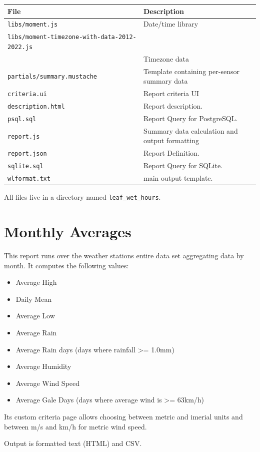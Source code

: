 \documentclass[a4paper,10pt]{book}
\begin{document}
\begin{tabular}{p{6cm} l}
\hline
\textbf{File} & \textbf{Description} \\
\hline
\verb|libs/moment.js| & Date/time library\\
\verb|libs/moment-timezone-with-data-2012-2022.js| & \\
& Timezone data \\
\verb|partials/summary.mustache| & Template containing per-sensor summary data\\
\verb|criteria.ui| & Report criteria UI \\
\verb|description.html| & Report description.\\
\verb|psql.sql| & Report Query for PostgreSQL. \\
\verb|report.js| & Summary data calculation and output formatting\\
\verb|report.json| & Report Definition. \\
\verb|sqlite.sql| & Report Query for SQLite. \\
\verb|wlformat.txt| & main output template.\\
\hline
\end{tabular}

All files live in a directory named \verb|leaf_wet_hours|.

\section{Monthly Averages}
This report runs over the weather stations entire data set aggregating data by month. It computes the following values:
\begin{itemize}
\item Average High
\item Daily Mean
\item Average Low
\item Average Rain
\item Average Rain days (days where rainfall >= 1.0mm)
\item Average Humidity
\item Average Wind Speed
\item Average Gale Days (days where average wind is >= 63km/h)
\end{itemize}

Its custom criteria page allows choosing between metric and imerial units and between m/s and km/h for metric wind speed.

Output is formatted text (HTML) and CSV.
\end{document}
